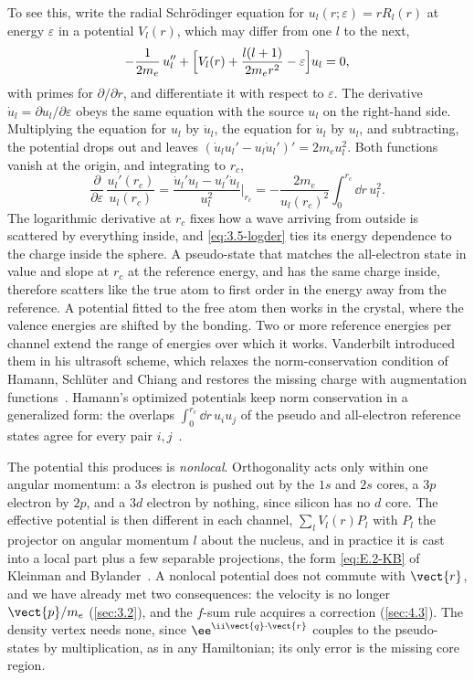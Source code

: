 To see this, write the radial Schr\"odinger equation for $u_l(r; \varepsilon) = rR_l(r)$ at energy $\varepsilon$ in a potential $V_l(r)$, which may differ from one $l$ to the next,
\begin{equation}
  -\frac{1}{2m_e}\,u_l'' + \Bigl[V_l(r) + \frac{l(l+1)}{2m_er^2} - \varepsilon\Bigr]u_l = 0 ,
  \label{eq:3.5-radial}
\end{equation}
with primes for $\partial/\partial r$, and differentiate it with respect to $\varepsilon$. The derivative $\dot u_l = \partial u_l/\partial\varepsilon$ obeys the same equation with the source $u_l$ on the right-hand side. Multiplying the equation for $u_l$ by $\dot u_l$, the equation for $\dot u_l$ by $u_l$, and subtracting, the potential drops out and leaves $(\dot u_lu_l' - u_l\dot u_l')' = 2m_eu_l^2$. Both functions vanish at the origin, and integrating to $r_c$,
\begin{equation}
  \frac{\partial}{\partial\varepsilon}\,\frac{u_l'(r_c)}{u_l(r_c)} = \frac{\dot u_l'u_l - u_l'\dot u_l}{u_l^2}\bigg|_{r_c} = -\frac{2m_e}{u_l(r_c)^2}\int_0^{r_c}\dd r\,u_l^2 .
  \label{eq:3.5-logder}
\end{equation}
The logarithmic derivative at $r_c$ fixes how a wave arriving from outside is scattered by everything inside, and \cref{eq:3.5-logder} ties its energy dependence to the charge inside the sphere. A pseudo-state that matches the all-electron state in value and slope at $r_c$ at the reference energy, and has the same charge inside, therefore scatters like the true atom to first order in the energy away from the reference. A potential fitted to the free atom then works in the crystal, where the valence energies are shifted by the bonding. Two or more reference energies per channel extend the range of energies over which it works. Vanderbilt introduced them in his ultrasoft scheme, which relaxes the norm-conservation condition of Hamann, Schl\"uter and Chiang and restores the missing charge with augmentation functions~\cite{vanderbilt1990soft}. Hamann's optimized potentials keep norm conservation in a generalized form: the overlaps $\int_0^{r_c}\dd r\,u_iu_j$ of the pseudo and all-electron reference states agree for every pair $i, j$~\cite[Eq.~(23)]{hamann2013optimized}.

The potential this produces is \emph{nonlocal}. Orthogonality acts only within one angular momentum: a $3s$ electron is pushed out by the $1s$ and $2s$ cores, a $3p$ electron by $2p$, and a $3d$ electron by nothing, since silicon has no $d$ core. The effective potential is then different in each channel, $\sum_lV_l(r)P_l$ with $P_l$ the projector on angular momentum $l$ about the nucleus, and in practice it is cast into a local part plus a few separable projections, the form \cref{eq:E.2-KB} of Kleinman and Bylander~\cite{kleinman1982efficacious}. A nonlocal potential does not commute with $\vect{r}$, and we have already met two consequences: the velocity is no longer $\vect{p}/m_e$ (\cref{sec:3.2}), and the $f$-sum rule acquires a correction (\cref{sec:4.3}). The density vertex needs none, since $\ee^{\ii\vect{q}\cdot\vect{r}}$ couples to the pseudo-states by multiplication, as in any Hamiltonian; its only error is the missing core region.

